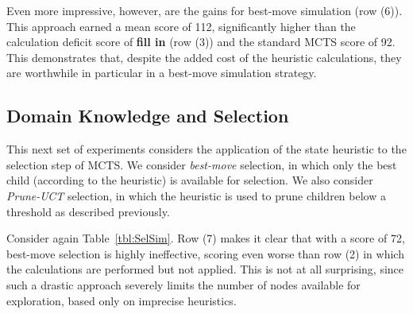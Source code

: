 \documentclass[letterpaper]{article}
\begin{document}
Even more impressive, however, are the gains for best-move simulation (row (6)). This approach earned a mean score of 112, significantly higher than the calculation deficit score of {\bf fill in} (row (3)) and the standard MCTS score of 92. This demonstrates that, despite the added cost of the heuristic calculations, they are worthwhile in particular in a best-move simulation strategy.


\subsection{Domain Knowledge and Selection}

%

This next set of experiments considers the application of the state heuristic to the selection step of MCTS. We consider {\it best-move} selection, in which only the best child (according to the heuristic) is available for selection. We also consider {\it Prune-UCT} selection, in which the heuristic is used to prune children below a threshold as described previously.

Consider again Table~\ref{tbl:SelSim}. Row (7) makes it clear that with a score of 72, best-move selection is highly ineffective, scoring even worse than row (2) in which the calculations are performed but not applied. This is not at all surprising, since such a drastic approach severely limits the number of nodes available for exploration, based only on imprecise heuristics.
\end{document}
